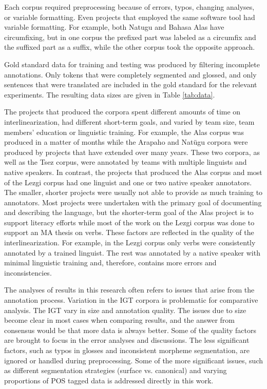 Each corpus required preprocessing because of errors, typos, changing analyses, or variable formatting. Even projects that employed the same software tool had variable formatting. For example, both Natugu and Bahasa Alas have circumfixing, but in one corpus the prefixed part was labeled as a circumfix and the suffixed part as a suffix, while the other corpus took the opposite approach. 

Gold standard data for training and testing was produced by filtering incomplete annotations. Only tokens that were completely segmented and glossed, and only sentences that were translated are included in the gold standard for the relevant experiments. The resulting data sizes are given in Table \ref{tab:data}.

The projects that produced the corpora spent different amounts of time on interlinearization, had different short-term goals, and varied by team size, team members' education or linguistic training. For example, the Alas corpus was produced in a matter of months while the Arapaho and Natügu corpora were produced by projects that have extended over many years. These two corpora, as well as the Tsez corpus, were annotated by teams with multiple linguists and native speakers. In contrast, the projects that produced the Alas corpus and most of the Lezgi corpus had one linguist and one or two native speaker annotators. The smaller, shorter projects were usually not able to provide as much training to annotators. Most projects were undertaken with the primary goal of documenting and describing the language, but the shorter-term goal of the Alas project is to support literacy efforts while most of the work on the Lezgi corpus was done to support an MA thesis on verbs. These factors are reflected in the quality of the interlinearization. For example, in the Lezgi corpus only verbs were consistently annotated by a trained linguist. The rest was annotated by a native speaker with minimal linguistic training and, therefore, contains more errors and inconsistencies. 

The analyses of results in this research often refers to issues that arise from the annotation process. 
Variation in the IGT corpora is problematic for comparative analysis. The IGT vary in size and annotation quality. The issues due to size become clear in most cases when comparing results, and the answer from consensus would be that more data is always better. Some of the quality factors are brought to focus in the error analyses and discussions.
The less significant factors, such as typos in glosses and inconsistent morpheme segmentation, are ignored or handled during preprocessing. Some of the more significant issues, such as different segmentation strategies (surface vs. canonical) and varying proportions of POS tagged data is addressed directly in this work.


